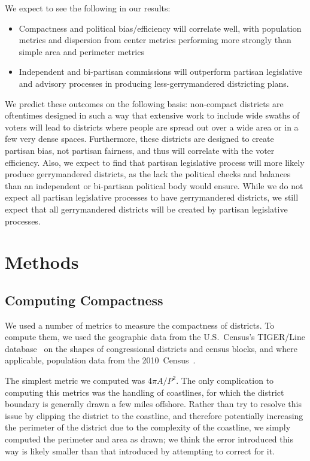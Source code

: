 \documentclass[12pt]{article}
\begin{document}
  We expect to see the following in our results:
  \begin{itemize}
  \item Compactness and political bias/efficiency will correlate well, with population metrics and dispersion from center metrics performing more strongly than simple area and perimeter metrics 
  \item Independent and bi-partisan commissions will outperform partisan legislative and advisory processes in producing less-gerrymandered districting plans.
  \end{itemize}
  
  We predict these outcomes on the following basis: non-compact districts are oftentimes designed in such a way that extensive work to include wide swaths of voters will lead to districts where people are spread out over a wide area or in a few very dense spaces.  Furthermore, these districts are designed to create partisan bias, not partisan fairness, and thus will correlate with the voter efficiency.  Also, we expect to find that partisan legislative process will more likely produce gerrymandered districts, as the lack the political checks and balances than an independent or bi-partisan political body would ensure.  While we do not expect all partisan legislative processes to have gerrymandered districts, we still expect that all gerrymandered districts will be created by partisan legislative processes.

  \section{Methods}

  \subsection{Computing Compactness}

  We used a number of metrics to measure the compactness of districts.  To compute them, we used the geographic data from the U.S.~Census's TIGER/Line database~\cite{censustiger} on the shapes of congressional districts and census blocks, and where applicable, population data from the 2010~Census~\cite{census2010}.

  The simplest metric we computed was $4\pi A/P^2$.  The only complication to computing this metrics was the handling of coastlines, for which the district boundary is generally drawn a few miles offshore.  Rather than try to resolve this issue by clipping the district to the coastline, and therefore potentially increasing the perimeter of the district due to the complexity of the coastline, we simply computed the perimeter and area as drawn; we think the error introduced this way is likely smaller than that introduced by attempting to correct for it.
  
\end{document}
